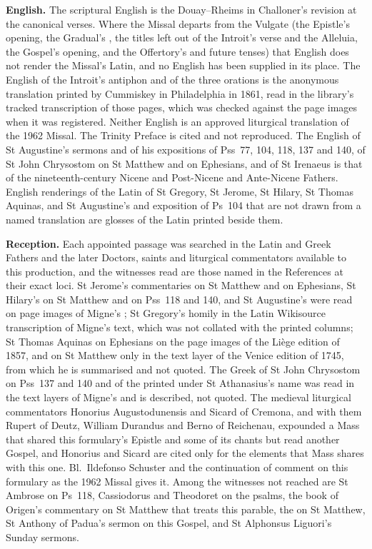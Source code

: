 {\textbf{English.} The scriptural English is the Douay--Rheims in Challoner's
revision at the canonical verses. Where the Missal departs from the Vulgate
(the Epistle's opening, the Gradual's , the titles left out of the
Introit's verse and the Alleluia, the Gospel's opening, and the Offertory's
 and future tenses) that English does not render the Missal's
Latin, and no English has been supplied in its place. The English of the
Introit's antiphon and of the three orations is the anonymous translation
printed by Cummiskey in Philadelphia in 1861, read in the library's tracked
transcription of those pages, which was checked against the page images when it
was registered. Neither English is an approved liturgical translation of the
1962 Missal. The Trinity Preface is cited and not reproduced. The English of
St Augustine's sermons and of his expositions of Pss~77, 104, 118, 137 and 140,
of St John Chrysostom on St Matthew and on Ephesians, and of St Irenaeus is that
of the nineteenth-century Nicene and Post-Nicene and Ante-Nicene Fathers.
English renderings of the Latin of St Gregory, St Jerome, St Hilary, St Thomas
Aquinas, and St Augustine's  and exposition of
Ps~104 that are not drawn from a named translation are glosses of the Latin
printed beside them.

\textbf{Reception.} Each appointed passage was searched in the Latin and Greek
Fathers and the later Doctors, saints and liturgical commentators available to
this production, and the witnesses read are those named in the References at
their exact loci. St Jerome's commentaries on St Matthew and on Ephesians, St
Hilary's on St Matthew and on Pss~118 and 140, and St Augustine's
 were read on page images of Migne's
; St Gregory's homily in the Latin Wikisource
transcription of Migne's text, which was not collated with the printed
columns; St Thomas Aquinas on Ephesians on the page images of the Liège
edition of 1857, and on St Matthew only in the text layer of the Venice
edition of 1745, from which he is summarised and not quoted. The Greek of St
John Chrysostom on Pss~137 and 140 and of the 
printed under St Athanasius's name was read in the text layers of Migne's
 and is described, not quoted. The medieval liturgical
commentators Honorius Augustodunensis and Sicard of Cremona, and with them
Rupert of Deutz, William Durandus and Berno of Reichenau, expounded a Mass
that shared this formulary's Epistle and some of its chants but read another
Gospel, and
Honorius and Sicard are cited only for the elements that Mass shares with this
one. Bl.\ Ildefonso Schuster and the continuation of 
comment on this formulary as the 1962 Missal gives it. Among the witnesses not
reached are St Ambrose on Ps~118, Cassiodorus and Theodoret on the psalms, the
book of Origen's commentary on St Matthew that treats this parable, the
 on St Matthew, St Anthony of Padua's sermon on this Gospel,
and St Alphonsus Liguori's Sunday sermons.

}
